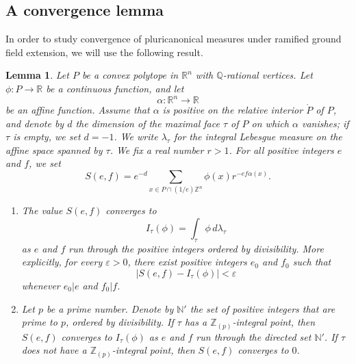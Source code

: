 \documentclass[JEP,XML,SOM,Unicode,NoFloatCountersInSection]{cedram}
\newtheorem{lemma}[equation]{Lemma}
\theoremstyle{definition}
\numberwithin{equation}{subsection}
\newcommand{\N}{\ensuremath{\mathbb{N}}}
\newcommand{\Z}{\ensuremath{\mathbb{Z}}}
\newcommand{\Q}{\ensuremath{\mathbb{Q}}}
\newcommand{\R}{\ensuremath{\mathbb{R}}}
\begin{document}
\subsection{A convergence lemma}
In order to study convergence of pluricanonical measures under ramified ground field extension, we will use the following result.
\begin{lemma}\label{lemm:int}
Let $P$ be a convex polytope in $\R^n$ with $\Q$-rational vertices. Let $\phi\colon P\to \R$ be a continuous function, and let
\[
\alpha\colon \R^{n}\to \R
\]
be an affine function.
Assume that $\alpha$ is positive on the relative interior $\mathring{P}$ of $P$, and denote by $d$ the dimension of the maximal face $\tau$ of $P$ on which $\alpha$ vanishes; if $\tau$ is empty, we set $d=-1$.
We write $\lambda_{\tau}$ for the integral Lebesgue measure on the affine space spanned by $\tau$.
We fix a real number $r>1$. For all positive integers $e$ and $f$, we set
\[
S(e,f)=e^{-d}\sum_{x\in P\cap (1/e)\Z^n}\phi(x)r^{-ef\alpha(x)}.
\]

\begin{enumerate}
\item \label{it:convwild} The value $S(e,f)$ converges to
\[
I_{\tau}(\phi)=\int_{\tau}\phi\, d\lambda_{\tau}
\]
as $e$ and $f$ run through the positive integers ordered by divisibility. More explicitly, for every $\varepsilon>0$, there exist positive integers $e_0$ and $f_0$ such that
\[
|S(e,f)-I_{\tau}(\phi)|<\varepsilon
\]
whenever $e_0|e$ and $f_0|f$.

\item \label{it:convtame} Let $p$ be a prime number. Denote by $\N'$ the set of positive integers that are prime to $p$, ordered by divisibility. If $\tau$ has a $\Z_{(p)}$-integral point, then
$S(e,f)$ converges to $I_{\tau}(\phi)$ as $e$ and $f$ run through the directed set $\N'$. If $\tau$ does not have a $\Z_{(p)}$-integral point, then $S(e,f)$ converges to $0$.
\end{enumerate}
\end{lemma}
\end{document}

